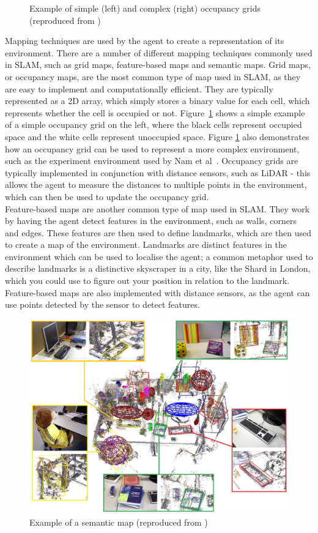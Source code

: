 \documentclass[12pt]{article}
\begin{document}
\begin{figure}[h]
\begin{minipage}{0.4\textwidth}
    \end{minipage}
    \caption[Short caption]{Example of simple (left) and complex (right) occupancy grids (reproduced from \cite{occupancy_grid})}
    \label{fig:occupancy_grid}
\end{figure}

Mapping techniques are used by the agent to create a representation of its environment.
There are a number of different mapping techniques commonly used in SLAM, such as grid maps, feature-based maps and semantic maps.
Grid maps, or occupancy maps, are the most common type of map used in SLAM, as they are easy to implement and computationally efficient.
They are typically represented as a 2D array, which simply stores a binary value for each cell, which represents whether the cell is occupied or not.
Figure~\ref{fig:occupancy_grid} shows a simple example of a simple occupancy grid on the left, where the black cells represent occupied space and
the white cells represent unoccupied space.
Figure \ref{fig:occupancy_grid} also demonstrates how an occupancy grid can be used to represent a more complex environment, such as the experiment
environment used by Nam et al~\cite{occupancy_grid}.
Occupancy grids are typically implemented in conjunction with distance sensors, such as LiDAR - this allows the agent to measure the distances to multiple
points in the environment, which can then be used to update the occupancy grid. \\
Feature-based maps are another common type of map used in SLAM. They work by having the agent detect features in the environment, such as
walls, corners and edges.
These features are then used to define landmarks, which are then used to create a map of the environment.
Landmarks are distinct features in the environment which can be used to localise the agent; a common metaphor used to describe landmarks is a distinctive
skyscraper in a city, like the Shard in London, which you could use to figure out your position in relation to the landmark.
Feature-based maps are also implemented with distance sensors, as the agent can use points detected by the sensor to detect features. \\
\begin{figure}
    \centering
    \includegraphics[width=0.7\linewidth]{semantic_maps}
    \caption[Short caption]{Example of a semantic map (reproduced from \cite{semantic_map})}
    \label{fig:semantic_map}
\end{figure}
\end{document}
